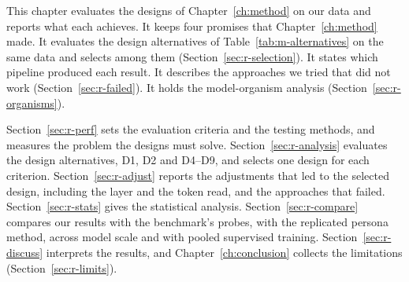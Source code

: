 \label{ch:results}

This chapter evaluates the designs of Chapter~\ref{ch:method} on our data and reports what each achieves.
It keeps four promises that Chapter~\ref{ch:method} made.
It evaluates the design alternatives of Table~\ref{tab:m-alternatives} on the same data and selects among them (Section~\ref{sec:r-selection}).
It states which pipeline produced each result.
It describes the approaches we tried that did not work (Section~\ref{sec:r-failed}).
It holds the model-organism analysis (Section~\ref{sec:r-organisms}).

Section~\ref{sec:r-perf} sets the evaluation criteria and the testing methods, and measures the problem the designs must solve.
Section~\ref{sec:r-analysis} evaluates the design alternatives, D1, D2 and D4--D9, and selects one design for each criterion.
Section~\ref{sec:r-adjust} reports the adjustments that led to the selected design, including the layer and the token read, and the approaches that failed.
Section~\ref{sec:r-stats} gives the statistical analysis.
Section~\ref{sec:r-compare} compares our results with the benchmark's probes, with the replicated persona method, across model scale and with pooled supervised training.
Section~\ref{sec:r-discuss} interprets the results, and Chapter~\ref{ch:conclusion} collects the limitations (Section~\ref{sec:r-limits}).

